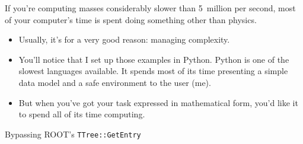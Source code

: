 \documentclass[aspectratio=169]{beamer}
\begin{document}




\begin{frame}{}
\vspace{1 cm}
\begin{center}
\large If you're computing masses considerably slower than 5~million per second, most of your computer's time is spent doing something other than physics.
\end{center}

\vspace{0.5 cm}
\begin{itemize}
\item<2-> Usually, it's for a very good reason: managing complexity.
\item<3-> You'll notice that I set up those examples in Python. Python is one of the slowest languages available. It spends most of its time presenting a simple data model and a safe environment to the user (me).
\item<4-> But when you've got your task expressed in mathematical form, you'd like it to spend all of its time computing.
\end{itemize}
\end{frame}

\begin{frame}{Bypassing ROOT's {\tt TTree::GetEntry}}
\vspace{0.5 cm}



\end{frame}
\end{document}
